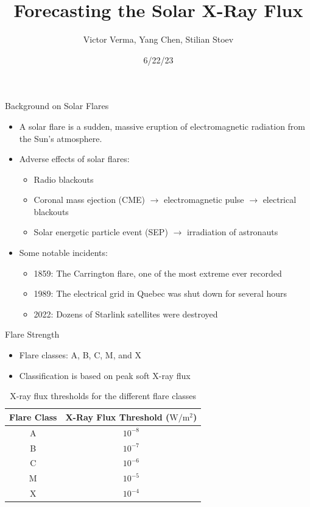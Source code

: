 \documentclass{beamer}
\title[Forecasting the Solar X-Ray Flux]{Forecasting the Solar X-Ray Flux}
\author{Victor Verma, Yang Chen, Stilian Stoev}
\institute[]
{
Department of Statistics \\
University of Michigan
}
\date[6/22/23]{6/22/23}
\begin{document}
\begin{frame}
    \titlepage
\end{frame}


\begin{frame}{Background on Solar Flares}
    \begin{itemize}
        \item A solar flare is a sudden, massive eruption of electromagnetic radiation from the Sun's atmosphere.
        \item Adverse effects of solar flares: 
        \begin{itemize}
            \item Radio blackouts
            \item Coronal mass ejection (CME) $\rightarrow$ electromagnetic pulse $\rightarrow$ electrical blackouts
            \item Solar energetic particle event (SEP) $\rightarrow$ irradiation of astronauts
        \end{itemize}
        \item Some notable incidents:
        \begin{itemize}
            \item 1859: The Carrington flare, one of the most extreme ever recorded
            \item 1989: The electrical grid in Quebec was shut down for several hours
            \item 2022: Dozens of Starlink satellites were destroyed
        \end{itemize}
    \end{itemize}
\end{frame}

\begin{frame}{Flare Strength}
    \begin{itemize}
        \item Flare classes: A, B, C, M, and X
        \item Classification is based on peak soft X-ray flux
    \end{itemize}
    \begin{table}
        \centering
        \begin{tabular}{|c|c|}
            \hline
            Flare Class & X-Ray Flux Threshold ($\text{W} / \text{m}^2$) \\
            \hline
            A & $10^{-8}$ \\
            B & $10^{-7}$ \\
            C & $10^{-6}$ \\
            M & $10^{-5}$ \\
            X & $10^{-4}$ \\
            \hline
        \end{tabular}
        \caption{X-ray flux thresholds for the different flare classes}
        \label{tab:flare_classes}
    \end{table}    
\end{frame}
\end{document}
